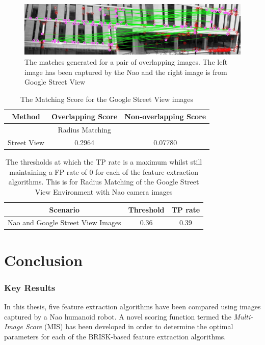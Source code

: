 \documentclass[11pt]{report}
\begin{document}
 \begin{figure}[h!] 
  \centering
    \includegraphics[width=1.0\textwidth]{../Drawings/Matching/GoogleStreetViewDataset.jpg}
    \caption{The matches generated for a pair of overlapping images. The left image has been captured by the Nao and the right image is from Google Street View}
    \label{fig:google_matches}
\end{figure}


\begin{table}
\centering
\caption{The Matching Score for the Google Street View images}
\begin{tabular}{|c|c|c|}
\hline 
Method & Overlapping Score & Non-overlapping Score\tabularnewline
\hline 
\hline 
 & Radius Matching & \tabularnewline
\hline 
Street View & 0.2964 & 0.07780\tabularnewline
\hline 
\end{tabular}
\label{tab:ms_google}
\end{table}

\begin{table}
\centering
\caption{The thresholds at which the TP rate is a maximum whilst still maintaining
a FP rate of 0 for each of the feature extraction algorithms. This
is for Radius Matching of the Google Street View Environment with
Nao camera images}
\begin{tabular}{|c|c|c|}
\hline 
Scenario & Threshold & TP rate\tabularnewline
\hline 
\hline 
Nao and Google Street View Images & 0.36 & 0.39\tabularnewline
\hline 
\end{tabular}
\label{tab:tp_rate_google}
\end{table}


\chapter{Conclusion}
\label{sec:Conclusion}



\subsection{Key Results}
\label{sec:keyResults}
In this thesis, five feature extraction algorithms have been compared using images captured by a Nao humanoid robot. A novel scoring function termed the \textit{Multi-Image Score} (MIS) has been developed in order to determine the optimal parameters for each  of the BRISK-based feature extraction algorithms.\\
\end{document}
